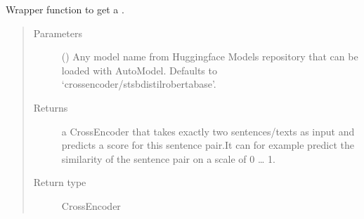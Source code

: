 \documentclass[letterpaper,10pt,english]{sphinxmanual}
\begin{document}
\begin{fulllineitems}
\label{\detokenize{code:code_utils.utils.get_crossencoder}}
Wrapper function to get a .
\begin{quote}\begin{description}
\item[{Parameters}] \leavevmode
{} (\sphinxstyleliteralemphasis{\sphinxupquote{, }}) \textendash{} Any model name from Huggingface Models repository that can
be loaded with AutoModel. Defaults to ‘cross\sphinxhyphen{}encoder/stsb\sphinxhyphen{}distilroberta\sphinxhyphen{}base’.

\item[{Returns}] \leavevmode
a CrossEncoder that takes exactly two sentences/texts as input and predicts
a score for this sentence pair.It can for example predict the similarity of the
sentence pair on a scale of 0 … 1.

\item[{Return type}] \leavevmode
CrossEncoder

\end{description}\end{quote}

\end{fulllineitems}

\end{document}
